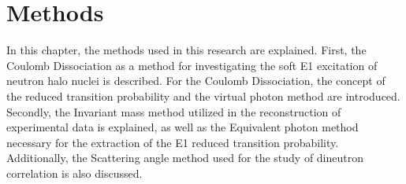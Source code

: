 \chapter{Methods}

In this chapter, the methods used in this research are explained. First, the Coulomb Dissociation as a method for investigating the soft E1 excitation of neutron halo nuclei is described. For the Coulomb Dissociation, the concept of the reduced transition probability and the virtual photon method are introduced. Secondly, the Invariant mass method utilized in the reconstruction of experimental data is explained, as well as the Equivalent photon method necessary for the extraction of the E1 reduced transition probability. Additionally, the Scattering angle method used for the study of dineutron correlation is also discussed.

